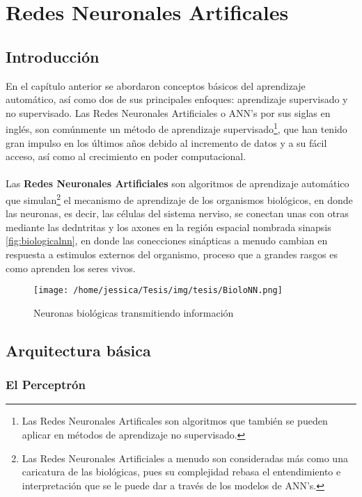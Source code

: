 \chapter{Redes Neuronales Artificales}\label{ch:NNBasics}
\section{Introducción}

En el capítulo anterior se abordaron conceptos básicos del aprendizaje automático, así como dos de sus principales enfoques: aprendizaje supervisado y no supervisado. Las Redes Neuronales Artificiales o ANN's por sus siglas en inglés, son comúnmente un método de aprendizaje supervisado\footnote{Las Redes Neuronales Artificales son algoritmos que también se pueden aplicar en métodos de aprendizaje no supervisado.}, que han tenido gran impulso en los últimos años debido al incremento de datos y a su fácil acceso, así como al crecimiento en poder computacional.
\\
\\
Las \textbf{Redes Neuronales Artificiales}  son algoritmos de aprendizaje automático que simulan\footnote{Las Redes Neuronales Artificiales a menudo son consideradas más como una caricatura de las biológicas, pues su complejidad rebasa el entendimiento e interpretación que se le puede dar a través de los modelos de ANN's.} el mecanismo de aprendizaje de los organismos biológicos, en donde las neuronas, es decir, las células del sistema nerviso, se conectan unas con otras mediante las dedntritas y los axones en la región espacial nombrada sinapsis \autoref{fig:biologicalnn}, en donde las conecciones sinápticas a menudo cambian en respuesta a estimulos externos del organismo, proceso que a grandes rasgos es como aprenden los seres vivos. \cite{Gardell:2010}

\begin{figure}[hb]
  \centering
  \texttt{[image: /home/jessica/Tesis/img/tesis/BioloNN.png]}
  \caption{Neuronas biológicas transmitiendo información}
  \label{fig:biologicalnn}
\end{figure}


\section{Arquitectura básica}

\subsection{El Perceptrón}


